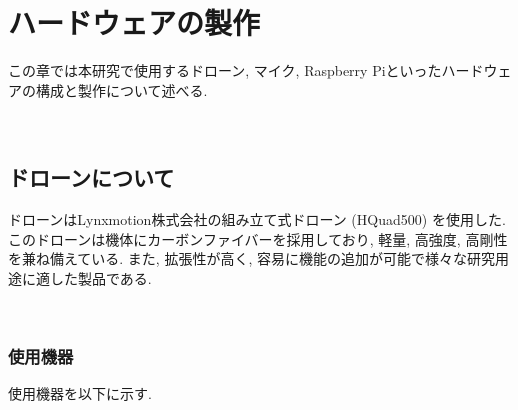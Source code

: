 \chapter{ハードウェアの製作}\label{hardware}

この章では本研究で使用するドローン, マイク, Raspberry
Piといったハードウェアの構成と製作について述べる. 

\
\section{ドローンについて}\label{about-drone}

ドローンはLynxmotion株式会社の組み立て式ドローン (HQuad500) を使用した. このドローンは機体にカーボンファイバーを採用しており, 軽量, 高強度, 高剛性を兼ね備えている. また, 拡張性が高く, 容易に機能の追加が可能で様々な研究用途に適した製品である. 

\
\subsection{使用機器}\label{used-equipments-drone}

使用機器を以下に示す. 

